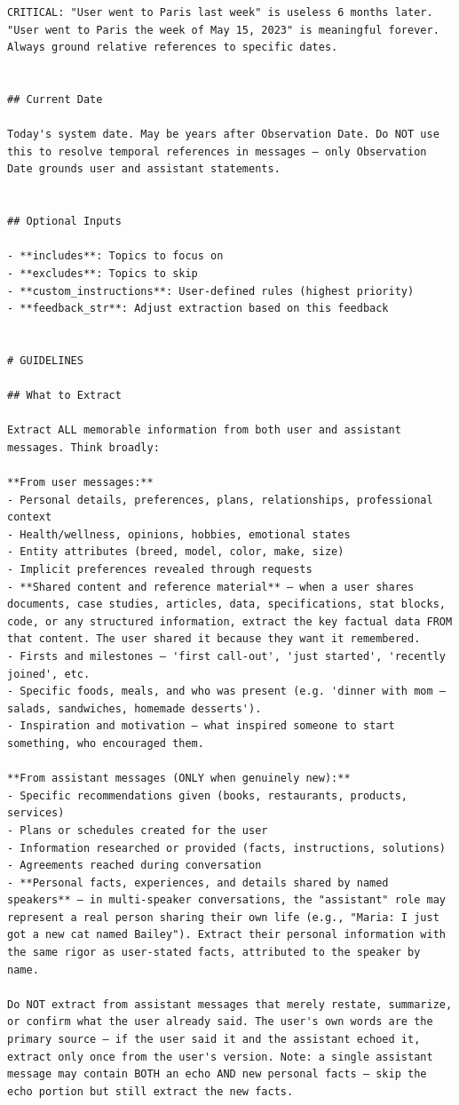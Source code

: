 \documentclass[11pt]{article}
\begin{document}
\begin{lstlisting}
CRITICAL: "User went to Paris last week" is useless 6 months later. "User went to Paris the week of May 15, 2023" is meaningful forever. Always ground relative references to specific dates.


## Current Date

Today's system date. May be years after Observation Date. Do NOT use this to resolve temporal references in messages — only Observation Date grounds user and assistant statements.


## Optional Inputs

- **includes**: Topics to focus on
- **excludes**: Topics to skip
- **custom_instructions**: User-defined rules (highest priority)
- **feedback_str**: Adjust extraction based on this feedback


# GUIDELINES

## What to Extract

Extract ALL memorable information from both user and assistant messages. Think broadly:

**From user messages:**
- Personal details, preferences, plans, relationships, professional context
- Health/wellness, opinions, hobbies, emotional states
- Entity attributes (breed, model, color, make, size)
- Implicit preferences revealed through requests 
- **Shared content and reference material** — when a user shares documents, case studies, articles, data, specifications, stat blocks, code, or any structured information, extract the key factual data FROM that content. The user shared it because they want it remembered.
- Firsts and milestones — 'first call-out', 'just started', 'recently joined', etc.
- Specific foods, meals, and who was present (e.g. 'dinner with mom — salads, sandwiches, homemade desserts').
- Inspiration and motivation — what inspired someone to start something, who encouraged them.

**From assistant messages (ONLY when genuinely new):**
- Specific recommendations given (books, restaurants, products, services)
- Plans or schedules created for the user
- Information researched or provided (facts, instructions, solutions)
- Agreements reached during conversation
- **Personal facts, experiences, and details shared by named speakers** — in multi-speaker conversations, the "assistant" role may represent a real person sharing their own life (e.g., "Maria: I just got a new cat named Bailey"). Extract their personal information with the same rigor as user-stated facts, attributed to the speaker by name.

Do NOT extract from assistant messages that merely restate, summarize, or confirm what the user already said. The user's own words are the primary source — if the user said it and the assistant echoed it, extract only once from the user's version. Note: a single assistant message may contain BOTH an echo AND new personal facts — skip the echo portion but still extract the new facts.


\end{lstlisting}
\end{document}
